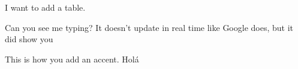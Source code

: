 
I want to add a table.

Can you see me typing? It doesn't update in real time like Google does, but it did show you

This is how you add an accent. Holá
